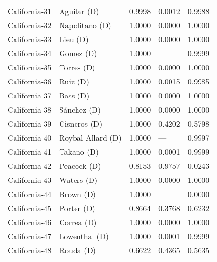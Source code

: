 \begin{longtable}{llrll}
     California-31 &         {\color{Blue} Aguilar (D)} &       0.9998 &        0.0012 &        0.9988 \\
     California-32 &      {\color{Blue} Napolitano (D)} &       1.0000 &        0.0000 &        1.0000 \\
     California-33 &            {\color{Blue} Lieu (D)} &       1.0000 &        0.0000 &        1.0000 \\
     California-34 &           {\color{Blue} Gomez (D)} &       1.0000 &           --- &        0.9999 \\
     California-35 &          {\color{Blue} Torres (D)} &       1.0000 &        0.0000 &        1.0000 \\
     California-36 &            {\color{Blue} Ruiz (D)} &       1.0000 &        0.0015 &        0.9985 \\
     California-37 &            {\color{Blue} Bass (D)} &       1.0000 &        0.0000 &        1.0000 \\
     California-38 &         {\color{Blue} Sánchez (D)} &       1.0000 &        0.0000 &        1.0000 \\
     California-39 &        {\color{Blue} Cisneros (D)} &       1.0000 &        0.4202 &        0.5798 \\
     California-40 &   {\color{Blue} Roybal-Allard (D)} &       1.0000 &           --- &        0.9997 \\
     California-41 &          {\color{Blue} Takano (D)} &       1.0000 &        0.0001 &        0.9999 \\
     California-42 &         {\color{Blue} Peacock (D)} &       0.8153 &        0.9757 &        0.0243 \\
     California-43 &          {\color{Blue} Waters (D)} &       1.0000 &        0.0000 &        1.0000 \\
     California-44 &           {\color{Blue} Brown (D)} &       1.0000 &           --- &        0.0000 \\
     California-45 &          {\color{Blue} Porter (D)} &       0.8664 &        0.3768 &        0.6232 \\
     California-46 &          {\color{Blue} Correa (D)} &       1.0000 &        0.0000 &        1.0000 \\
     California-47 &       {\color{Blue} Lowenthal (D)} &       1.0000 &        0.0001 &        0.9999 \\
     California-48 &           {\color{Blue} Rouda (D)} &       0.6622 &        0.4365 &        0.5635 \\

\end{longtable}
